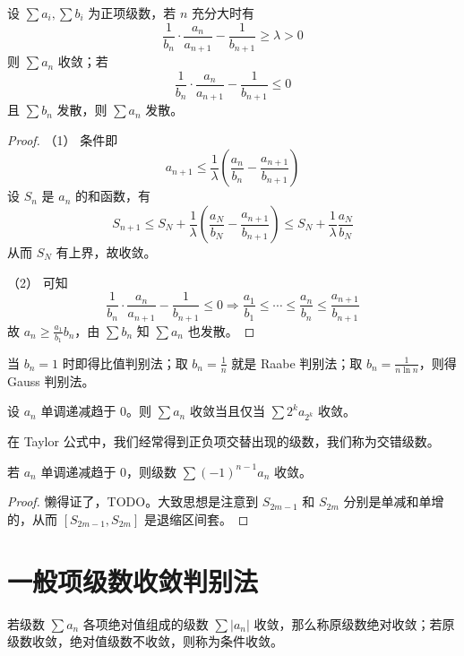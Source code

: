 \begin{theorem}[Kummer]
	设 $\sum a_i, \sum b_i$ 为正项级数，若 $n$ 充分大时有
	\[ \frac{1}{b_n} \cdot \frac{a_n}{a_{n+1}} - \frac{1}{b_{n+1}} \geqslant \lambda > 0 \]
	则 $\sum a_n$ 收敛；若
	\[ \frac{1}{b_n} \cdot \frac{a_n}{a_{n+1}} - \frac{1}{b_{n+1}} \leqslant 0 \]
	且 $\sum b_n$ 发散，则 $\sum a_n$ 发散。
\end{theorem}

\begin{proof}
	（1） 条件即
	\[ a_{n+1} \leqslant \frac{1}{\lambda} \left( \frac{a_n}{b_n} - \frac{a_{n+1}}{b_{n+1}} \right) \]
	设 $S_n$ 是 $a_n$ 的和函数，有
	\[ S_{n+1} \leqslant S_N +\frac{1}{\lambda} \left( \frac{a_N}{b_N} - \frac{a_{n+1}}{b_{n+1}} \right) \leqslant S_N + \frac{1}{\lambda} \frac{a_N}{b_N} \]
	从而 $S_N$ 有上界，故收敛。
	
	（2） 可知
	\[ \frac{1}{b_n} \cdot \frac{a_n}{a_{n+1}} - \frac{1}{b_{n+1}} \leqslant 0 \Longrightarrow \frac{a_1}{b_1} \leqslant \cdots \leqslant \frac{a_n}{b_n} \leqslant \frac{a_{n+1}}{b_{n+1}} \]
	故 $a_n \geqslant \frac{a_1}{b_1} b_n$，由 $\sum b_n$ 知 $\sum a_n$ 也发散。
\end{proof}

当 $b_n = 1$ 时即得比值判别法；取 $b_n = \frac{1}{n}$ 就是 Raabe 判别法；取 $b_n = \frac{1}{n \ln n}$，则得 Gauss 判别法。

\begin{theorem}
	设 $a_n$ 单调递减趋于 $0$。则 $\sum a_n$ 收敛当且仅当 $\sum 2^k a_{2^k}$ 收敛。
\end{theorem}

在 Taylor 公式中，我们经常得到正负项交替出现的级数，我们称为交错级数。

\begin{theorem}
	若 $a_n$ 单调递减趋于 $0$，则级数 $\sum (-1)^{n-1} a_n$ 收敛。
\end{theorem}

\begin{proof}
	懒得证了，TODO。大致思想是注意到 $S_{2m-1}$ 和 $S_{2m}$ 分别是单减和单增的，从而 $[S_{2m-1}, S_{2m}]$ 是退缩区间套。
\end{proof}

\section{一般项级数收敛判别法}

若级数 $\sum a_n$ 各项绝对值组成的级数 $\sum |a_n|$ 收敛，那么称原级数绝对收敛；若原级数收敛，绝对值级数不收敛，则称为条件收敛。


